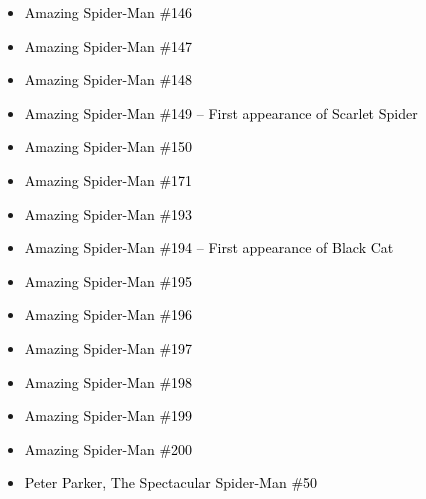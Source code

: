 \documentclass[12pt]{article}
\newcommand{\checkbox}{\raisebox{0.0ex}{\fbox{\rule{0ex}{1.5ex} \rule{1.5ex}{0ex}}}}
\begin{document}
\begin{center}
\begin{tcolorbox}[colback=white!95!gray, colframe=black, width=0.9\textwidth, arc=4mm, auto outer arc, boxrule=0.8pt]
\begin{itemize}[left=0pt,label={\checkbox}]
    \item \textcolor{black}{Amazing Spider-Man \#146}
    \item \textcolor{black}{Amazing Spider-Man \#147}
    \item \textcolor{black}{Amazing Spider-Man \#148}
    \item \textcolor{black}{Amazing Spider-Man \#149 – First appearance of Scarlet Spider}
    \item \textcolor{black}{Amazing Spider-Man \#150}
    \item \textcolor{black}{Amazing Spider-Man \#171}
    \item \textcolor{black}{Amazing Spider-Man \#193}
    \item \textcolor{black}{Amazing Spider-Man \#194 – First appearance of Black Cat}
    \item \textcolor{black}{Amazing Spider-Man \#195}
    \item \textcolor{black}{Amazing Spider-Man \#196}
    \item \textcolor{black}{Amazing Spider-Man \#197}
    \item \textcolor{black}{Amazing Spider-Man \#198}
    \item \textcolor{black}{Amazing Spider-Man \#199}
    \item \textcolor{black}{Amazing Spider-Man \#200}
    \item \textcolor{black}{Peter Parker, The Spectacular Spider-Man \#50}
\end{itemize}
\end{tcolorbox}
\end{center}
\end{document}
